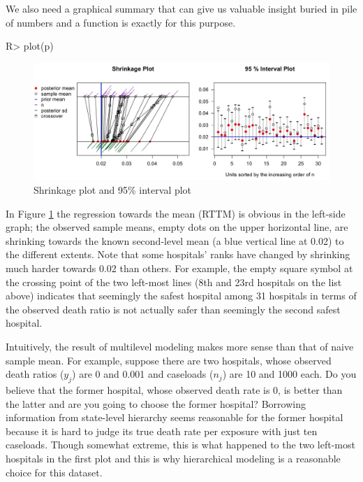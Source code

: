 \documentclass[article]{jss}
\begin{document}
We also need a graphical summary that can give us valuable insight buried in pile of numbers and a function  is exactly for this purpose.
\begin{CodeChunk}
\begin{CodeInput}
R> plot(p)
\end{CodeInput}
\end{CodeChunk}
\begin{figure}[h]
\begin{center}
\includegraphics[scale=0.25]{hospital1.png}
\caption{Shrinkage plot and 95\% interval plot}
\label{fig:hospshr}
\end{center}
\end{figure}

In Figure \ref{fig:hospshr} the regression towards the mean (RTTM) is obvious in the left-side graph; the observed sample means, empty dots on the upper horizontal line, are shrinking towards the known second-level mean (a blue vertical line at 0.02) to the different extents. Note that some hospitals' ranks have changed by shrinking much harder towards 0.02 than others. For example, the empty square symbol at the crossing point of the two left-most lines (8th and 23rd hospitals on the list above) indicates that seemingly the safest hospital among 31 hospitals in terms of the observed death ratio is not actually safer than seemingly the second safest hospital. 


Intuitively, the result of multilevel modeling makes more sense than that of naive sample mean. For example, suppose there are two hospitals, whose observed death ratios ($y_{j}$) are 0 and 0.001 and caseloads ($n_{j}$) are 10 and 1000 each. Do you believe that the former hospital, whose observed death rate is 0, is better than the latter and are you going to choose the former hospital? Borrowing information from state-level hierarchy seems reasonable for the former hospital because it is hard to judge its true death rate per exposure with just ten caseloads. Though somewhat extreme, this is what happened to the two left-most hospitals in the first plot and this is why hierarchical modeling is a reasonable choice for this dataset.
\end{document}
